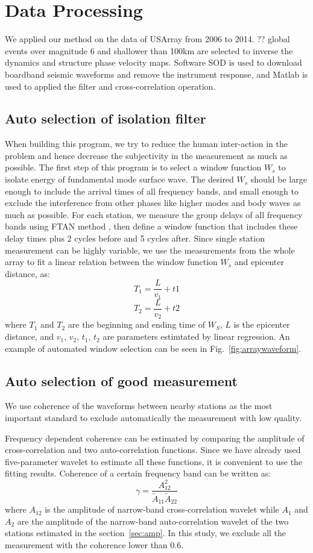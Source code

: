 \documentclass[referee]{gji}
\begin{document}
\section{Data Processing}
We applied our method on the data of USArray from 2006 to 2014. ?? global events over magnitude 6 and shallower than 100km are selected to inverse the dynamics and structure phase velocity maps. Software SOD \cite{Owens:2004sod} is used to download boardband seismic waveforms and remove the instrument response, and Matlab is used to applied the filter and cross-correlation operation.

\subsection{Auto selection of isolation filter}
When building this program, we try to reduce the human inter-action in the problem and hence decrease the subjectivity in the measurement as much as possible. 
The first step of this program is to select a window function $W_s$ to isolate energy of fundamental mode surface wave. The desired $W_s$ should be large enough to include the arrival times of all frequency bands, and small enough to exclude the interference from other phases like higher modes and body waves as much as possible. For each station, we measure the group delays of all frequency bands using FTAN method \cite{Levshin:1992ve}, then define a window function that includes these delay times plus 2 cycles before and 5 cycles after. Since single station measurement can be highly variable, we use the measurements from the whole array to fit a linear relation between the window function $W_s$ and epicenter distance, as:
\[
T_1 = \frac{L}{v_1} + t1
\]
\[
T_2 = \frac{L}{v_2} + t2
\]
where $T_1$ and $T_2$ are the beginning and ending time of $W_S$, $L$ is the epicenter distance, and $v_1$, $v_2$, $t_1$, $t_2$ are parameters estimtated by linear regression.
An example of automated window selection can be seen in Fig.~\ref{fig:arraywaveform}.

\subsection{Auto selection of good measurement}
We use coherence of the waveforms between nearby stations as the most important standard to exclude automatically the measurement with low quality. 

Frequency dependent coherence can be estimated by comparing the amplitude of cross-correlation and two auto-correlation functions. Since we have already used five-parameter wavelet to estimate all these functions, it is convenient to use the fitting results. Coherence of a certain frequency band can be written as:
\[
\gamma = \frac{A_{12}^2}{\tilde{A}_{11}\tilde{A}_{22}}
\]
where $A_{12}$ is the amplitude of narrow-band cross-correlation wavelet while $A_{1}$  and $A_{2}$ are the amplitude of the narrow-band auto-correlation wavelet of the two stations estimated in the section~\ref{sec:amp}. In this study, we exclude all the measurement with the coherence lower than 0.6.
\end{document}
